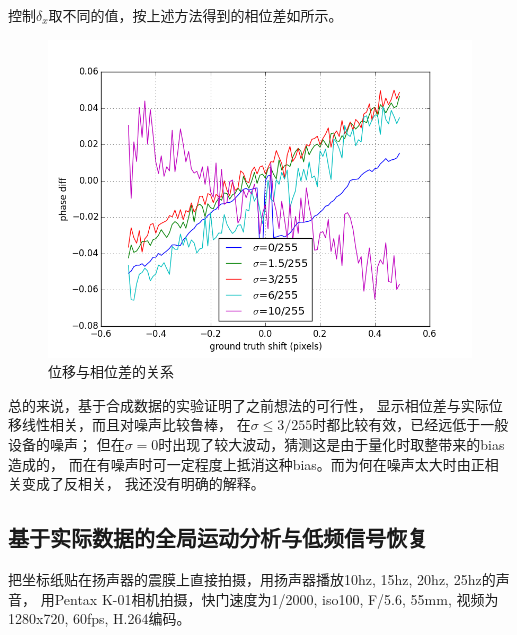 控制$\delta_x$取不同的值，按上述方法得到的相位差如所示。
\begin{figure}[tb]\begin{center}
    \includegraphics[width=.5\figwidth]{res/synth-pd.png}
    \caption{位移与相位差的关系}
    \label{fig:synthesis:pd}
\end{center}\end{figure}

总的来说，基于合成数据的实验证明了之前想法的可行性，
显示相位差与实际位移线性相关，而且对噪声比较鲁棒，
在$\sigma \le 3/255$时都比较有效，已经远低于一般设备的噪声；
但在$\sigma=0$时出现了较大波动，猜测这是由于量化时取整带来的bias造成的，
而在有噪声时可一定程度上抵消这种bias。而为何在噪声太大时由正相关变成了反相关，
我还没有明确的解释。


\subsection{基于实际数据的全局运动分析与低频信号恢复}

把坐标纸贴在扬声器的震膜上直接拍摄，用扬声器播放10hz, 15hz, 20hz, 25hz的声音，
用Pentax K-01相机拍摄，快门速度为1/2000, iso100, F/5.6, 55mm, 视频为1280x720, 60fps,
H.264编码。

